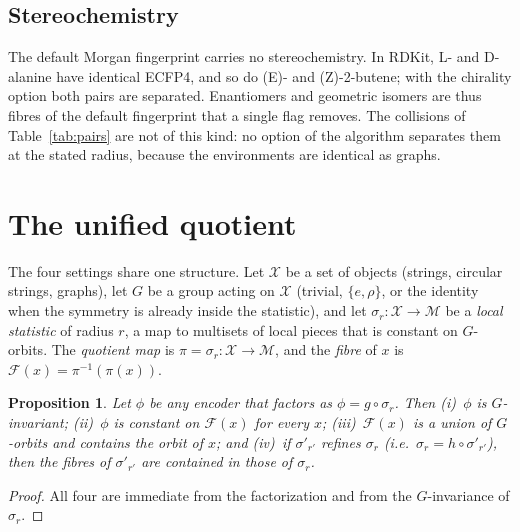 \documentclass[11pt]{article}
\theoremstyle{plain}
\newtheorem{proposition}[theorem]{Proposition}
\theoremstyle{definition}
\theoremstyle{remark}
\newcommand{\Fib}{\mathcal F}
\begin{document}
\subsection{Stereochemistry}

The default Morgan fingerprint carries no stereochemistry. In RDKit, L- and D-alanine have identical ECFP4,
and so do (E)- and (Z)-2-butene; with the chirality option both pairs are separated. Enantiomers and
geometric isomers are thus fibres of the default fingerprint that a single flag removes. The collisions of
Table~\ref{tab:pairs} are not of this kind: no option of the algorithm separates them at the stated radius,
because the environments are identical as graphs.

\section{The unified quotient}\label{sec:unified}

The four settings share one structure. Let $\mathcal X$ be a set of objects (strings, circular strings, graphs),
let $G$ be a group acting on $\mathcal X$ (trivial, $\{e,\rho\}$, or the identity when the symmetry is already
inside the statistic), and let $\sigma_r\colon\mathcal X\to\mathcal M$ be a \emph{local statistic} of radius $r$, a
map to multisets of local pieces that is constant on $G$-orbits. The \emph{quotient map} is
$\pi=\sigma_r\colon\mathcal X\to\mathcal M$, and the \emph{fibre} of $x$ is $\Fib(x)=\pi^{-1}(\pi(x))$.

\begin{proposition}\label{prop:unified}
Let $\phi$ be any encoder that factors as $\phi=g\circ\sigma_r$. Then (i)~$\phi$ is $G$-invariant; (ii)~$\phi$ is
constant on $\Fib(x)$ for every $x$; (iii)~$\Fib(x)$ is a union of $G$-orbits and contains the orbit of $x$; and
(iv)~if $\sigma'_{r'}$ refines $\sigma_r$ (i.e.\ $\sigma_r=h\circ\sigma'_{r'}$), then the fibres of $\sigma'_{r'}$ are
contained in those of $\sigma_r$.
\end{proposition}

\begin{proof}
All four are immediate from the factorization and from the $G$-invariance of $\sigma_r$.
\end{proof}
\end{document}
